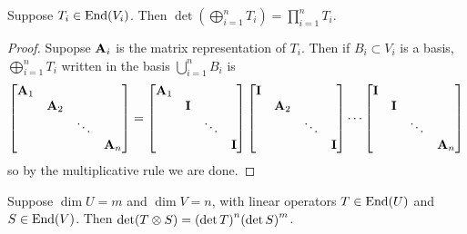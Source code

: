 \begin{lemma}\label{lem:det-direct-sum}
    Suppose \(T_i \in \operatorname{End}(V_i)\).
    Then \(\det(\bigoplus_{i=1}^n T_i) = \prod_{i=1}^n T_i\).
\end{lemma}
\begin{proof}
    Supopse \(\vb{A}_i\) is the matrix representation of \(T_i\).
    Then if \(B_i \subset V_i\) is a basis,
    \(\bigoplus_{i=1}^n T_i\) written in the basis \(\bigcup_{i=1}^n B_i\) is
    \begin{equation*}
        \bmqty{\vb{A}_1 \\ & \vb{A}_2 \\ && \ddots \\ &&& \vb{A}_n}
        = \bmqty{\vb{A}_1 \\ & \vb{I} \\ && \ddots \\ &&& \vb{I}}
        \bmqty{\vb{I} \\ & \vb{A}_2 \\ && \ddots \\ &&& \vb{I}} \cdots
        \bmqty{\vb{I} \\ & \vb{I} \\ && \ddots \\ &&& \vb{A}_n}
    \end{equation*}
    so by the multiplicative rule we are done.
\end{proof}
\begin{theorem}
    Suppose \(\dim U = m\) and \(\dim V = n\),
    with linear operators \(T \in \operatorname{End}(U)\) and \(S \in \operatorname{End}(V)\).
    Then \(\det(T \otimes S) = \pqty{\det T}^n\pqty{\det S}^m\).
\end{theorem}
